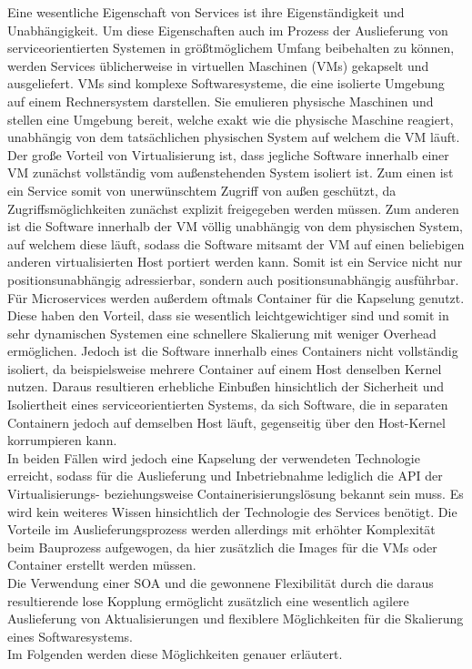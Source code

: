 Eine wesentliche Eigenschaft von Services ist ihre Eigenständigkeit und Unabhängigkeit. Um diese Eigenschaften auch im Prozess der Auslieferung von serviceorientierten Systemen in größtmöglichem Umfang beibehalten zu können, werden Services üblicherweise in virtuellen Maschinen (VMs) gekapselt und ausgeliefert. VMs sind komplexe Softwaresysteme, die eine isolierte Umgebung auf einem Rechnersystem darstellen. Sie emulieren physische Maschinen und stellen eine Umgebung bereit, welche exakt wie die physische Maschine reagiert, unabhängig von dem tatsächlichen physischen System auf welchem die VM läuft.\\
Der große Vorteil von Virtualisierung ist, dass jegliche Software innerhalb einer VM zunächst vollständig vom außenstehenden System isoliert ist. Zum einen ist ein Service somit von unerwünschtem Zugriff von außen geschützt, da Zugriffsmöglichkeiten zunächst explizit freigegeben werden müssen. Zum anderen ist die Software innerhalb der VM völlig unabhängig von dem physischen System, auf welchem diese läuft, sodass die Software mitsamt der VM auf einen beliebigen anderen virtualisierten Host portiert werden kann. Somit ist ein Service nicht nur positionsunabhängig adressierbar, sondern auch positionsunabhängig ausführbar.\\
Für Microservices werden außerdem oftmals Container für die Kapselung genutzt. Diese haben den Vorteil, dass sie wesentlich leichtgewichtiger sind und somit in sehr dynamischen Systemen eine schnellere Skalierung mit weniger Overhead ermöglichen. Jedoch ist die Software innerhalb eines Containers nicht vollständig isoliert, da beispielsweise mehrere Container auf einem Host denselben Kernel nutzen. Daraus resultieren erhebliche Einbußen hinsichtlich der Sicherheit und Isoliertheit eines serviceorientierten Systems, da sich Software, die in separaten Containern jedoch auf demselben Host läuft, gegenseitig über den Host-Kernel korrumpieren kann.\\
In beiden Fällen wird jedoch eine Kapselung der verwendeten Technologie erreicht, sodass für die Auslieferung und Inbetriebnahme lediglich die API der Virtualisierungs- beziehungsweise Containerisierungslösung bekannt sein muss. Es wird kein weiteres Wissen hinsichtlich der Technologie des Services benötigt. Die Vorteile im Auslieferungsprozess werden allerdings mit erhöhter Komplexität beim Bauprozess aufgewogen, da hier zusätzlich die Images für die VMs oder Container erstellt werden müssen.\\
Die Verwendung einer SOA und die gewonnene Flexibilität durch die daraus resultierende lose Kopplung ermöglicht zusätzlich eine wesentlich agilere Auslieferung von Aktualisierungen und flexiblere Möglichkeiten für die Skalierung eines Softwaresystems.\\
Im Folgenden werden diese Möglichkeiten genauer erläutert.

